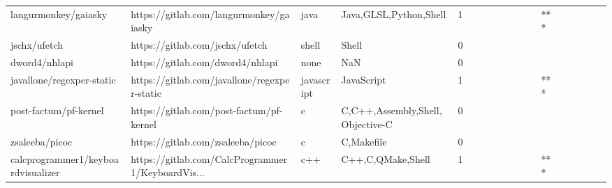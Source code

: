 \begin{tabular}{llllrlllllllllllll}
langurmonkey/gaiasky                               &            https://gitlab.com/langurmonkey/gaiasky &              java &                             Java,GLSL,Python,Shell &       1 &         &        &           &                &                 &        &           &       *** &          &          &       &              &          \\
jschx/ufetch                                       &                    https://gitlab.com/jschx/ufetch &             shell &                                              Shell &       0 &         &        &           &                &                 &        &           &           &          &          &       &              &          \\
dword4/nhlapi                                      &                   https://gitlab.com/dword4/nhlapi &              none &                                                NaN &       0 &         &        &           &                &                 &        &           &           &          &          &       &              &          \\
javallone/regexper-static                          &       https://gitlab.com/javallone/regexper-static &        javascript &                                         JavaScript &       1 &         &        &           &                &                 &        &           &       *** &          &          &       &              &          \\
post-factum/pf-kernel                              &           https://gitlab.com/post-factum/pf-kernel &                 c &                   C,C++,Assembly,Shell,Objective-C &       0 &         &        &           &                &                 &        &           &           &          &          &       &              &          \\
zsaleeba/picoc                                     &                  https://gitlab.com/zsaleeba/picoc &                 c &                                         C,Makefile &       0 &         &        &           &                &                 &        &           &           &          &          &       &              &          \\
calcprogrammer1/keyboardvisualizer                 &  https://gitlab.com/CalcProgrammer1/KeyboardVis... &               c++ &                                  C++,C,QMake,Shell &       1 &         &        &           &                &                 &        &           &       *** &          &          &       &              &          \\

\end{tabular}
